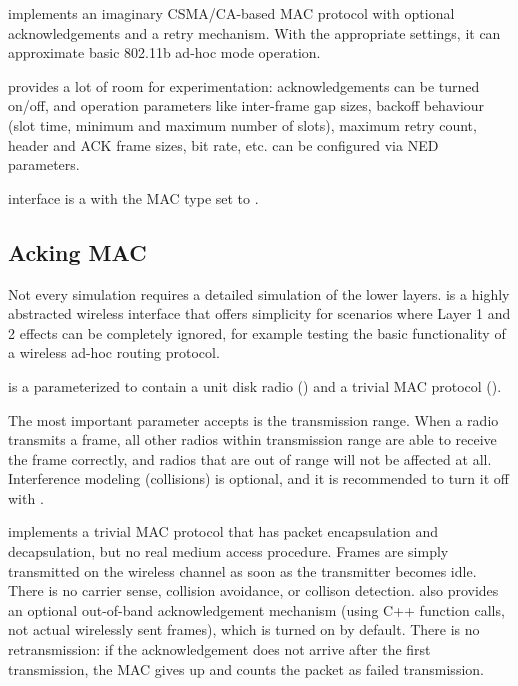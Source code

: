  implements an imaginary CSMA/CA-based MAC protocol with
optional acknowledgements and a retry mechanism. With the appropriate settings,
it can approximate basic 802.11b ad-hoc mode operation.

 provides a lot of room for experimentation: 
acknowledgements can be turned on/off, and operation parameters like
inter-frame gap sizes, backoff behaviour (slot time, minimum and maximum 
number of slots), maximum retry count, header and ACK frame sizes, bit rate,
etc. can be configured via NED parameters.

 interface is a  with
the MAC type set to . 

\subsection{Acking MAC}

Not every simulation requires a detailed simulation of the lower layers.
 is a highly abstracted wireless interface 
that offers simplicity for scenarios where Layer 1 and 2 effects can be 
completely ignored, for example testing the basic functionality of a 
wireless ad-hoc routing protocol.

 is a  
parameterized to contain a unit disk radio ()
and a trivial MAC protocol (). 

The most important parameter  accepts is the 
transmission range. When a radio transmits a frame, all other radios 
within transmission range are able to receive the frame correctly, 
and radios that are out of range will not be affected at all. 
Interference modeling (collisions) is optional, and it is recommended
to turn it off with .

 implements a trivial MAC protocol that has packet
encapsulation and decapsulation, but no real medium access procedure. 
Frames are simply transmitted on the wireless channel as soon as the
transmitter becomes idle. There is no carrier sense, collision avoidance, 
or collison detection.  also provides an optional 
out-of-band acknowledgement mechanism (using C++ function calls, 
not actual wirelessly sent frames), which is turned on by default.
There is no retransmission: if the acknowledgement does not arrive
after the first transmission, the MAC gives up and counts the packet 
as failed transmission. 

